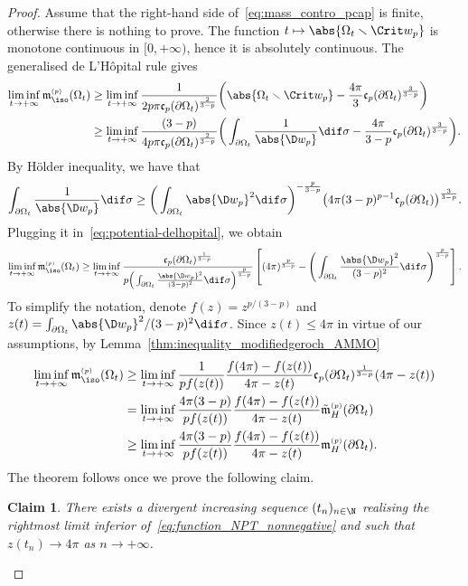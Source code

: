 \documentclass[10pt,a4paper]{amsart}
\numberwithin{equation}{section}
\newtheorem{Claim}[Theorem]{Claim}
\renewcommand{\ncapa}{\mathfrak{c}}
\newcommand{\ma}{\mathfrak{m}}
\newcommand{\tp}[1][p]{{\text{\tiny$(#1)$}}}
\begin{document}
\begin{proof} Assume that the right-hand side of~\eqref{eq:mass_contro_pcap} is finite, otherwise there is nothing to prove. The function $t\mapsto \abs{\Omega_t\smallsetminus \Crit w_p}$ is monotone continuous in $[0, +\infty)$, hence it is absolutely continuous. The generalised de L'H\^opital rule gives
\begin{align}
 \liminf_{t \to +\infty} \ma_{\iso}^{\tp}(\Omega_t)&{}\geq\liminf_{t \to +\infty} \frac{1}{2p\pi \ncapa_p(\partial \Omega_t)^{\frac{2}{3-p}}}\bigg( \abs{\Omega_t\smallsetminus \Crit w_p } -\frac{4 \pi}{3} \ncapa_p (\partial \Omega_t)^\frac{3}{3-p}\bigg)\nonumber\\
 &{}\geq \liminf_{t \to +\infty} \frac{(3-p)}{4 p\pi \ncapa_p(\partial \Omega_t)^{\frac{2}{3-p}}}\bigg(\int_{\partial \Omega_t} \frac{1}{\abs{\D w_p}} \dif \sigma-\frac{4 \pi}{3-p} \ncapa_p (\partial \Omega_t)^\frac{3}{3-p}\bigg).\label{eq:potential-delhopital}
\end{align}
By H\"{o}lder inequality, we have that
\[
 \int_{\partial \Omega_t }\frac{1}{\abs{\D w_p}} \dif \sigma \geq \bigg(\int_{\partial \Omega_t}\abs{\D w_p}^2 \dif \sigma\bigg)^{-\frac{p}{3-p}}\big( 4 \pi (3-p)^{p-1}\ncapa_p(\partial \Omega_t)\big)^{\frac{3}{3-p}}.
\]
Plugging it in~\eqref{eq:potential-delhopital}, we obtain
\[
 \liminf_{t \to +\infty} \ma_{\iso}^{\tp}(\Omega_t)\geq\liminf_{t \to +\infty} \frac{\ncapa_p(\partial \Omega_t)^{\frac{1}{3-p}}}{p\Big(\int_{\partial \Omega_t} \frac{\abs{ \D w_p}^2}{(3-p)^2} \dif \sigma\Big)^{\frac{p}{3-p}} }\left[ ( 4\pi)^{\frac{p}{3-p}}-\Bigg(\int_{\partial \Omega_t}\frac{\abs{ \D w_p}^2}{(3-p)^2} \dif \sigma \Bigg)^{\frac{p}{3-p}}\right].
\]
To simplify the notation, denote $f(z)=z^{p/(3-p)}$ and $z(t)=\int_{\partial \Omega_t} \abs{\D w_p}^2 /(3-p)^2 \dif \sigma$. Since $z(t)\leq 4 \pi$ in virtue of our assumptions, by Lemma~\ref{thm:inequality_modifiedgeroch_AMMO}
\begin{align}
 \liminf_{t \to +\infty} \ma_{\iso}^{\tp}(\Omega_t)&{}\geq \liminf_{t \to +\infty}\frac{1}{p f(z(t))} \frac{f(4 \pi )-f(z(t))}{4\pi-z(t)} \ncapa_p(\partial \Omega_t)^{\frac{1}{3-p}}( 4 \pi -z(t)) \nonumber\\
 &{}=\liminf_{t \to +\infty}\frac{4\pi(3-p)}{p f(z(t))} \frac{f(4 \pi )-f(z(t))}{4\pi-z(t)} \tilde{\ma}_{H}^{\tp}(\partial \Omega_t) \nonumber\\
 &{}\geq \liminf_{t \to +\infty}\frac{4\pi(3-p)}{p f(z(t))} \frac{f(4 \pi )-f(z(t))}{4\pi-z(t)} \ma_{H}^{\tp}(\partial \Omega_t).\label{eq:function_NPT_nonnegative}
\end{align}
The theorem follows once we prove the following claim.
\begin{Claim}
There exists a divergent increasing sequence $(t_n)_{n \in \N}$ realising the rightmost limit inferior of~\eqref{eq:function_NPT_nonnegative} and such that $z(t_n)\to 4 \pi$ as $n\to +\infty$.
\end{Claim}


\end{proof}
\end{document}
